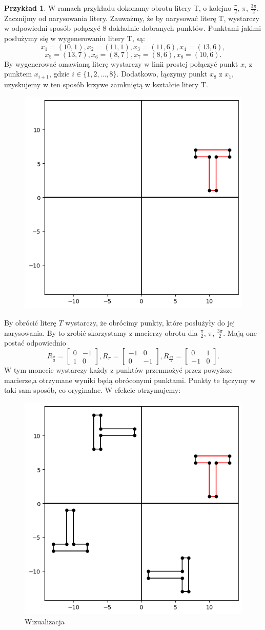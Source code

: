\documentclass[a4paper,twoside,11pt,reqno]{mwrep}
\theoremstyle{plain} \newtheorem{twr}{Twierdzenie}
\theoremstyle{plain} \newtheorem{lem}{Lemat}
\theoremstyle{definition} \newtheorem{defi}{Definicja}
\theoremstyle{remark} \newtheorem*{wni}{Wniosek}
\theoremstyle{definition} \newtheorem{uwaga}{Uwaga}
\theoremstyle{definition}\newtheorem{prz}{Przykład}
\begin{document}
\begin{prz}\label{exT_rotation}
W ramach przykładu dokonamy obrotu litery T, o kolejno $\frac{\pi}{2}$, $\pi$, $\frac{3\pi}{2}$.
Zacznijmy od narysowania litery. Zauważmy, że by narysować literę T, wystarczy w
odpowiedni sposób połączyć $8$ dokładnie dobranych punktów.
Punktami jakimi posłużymy się w wygenerowaniu litery T, są:
$$x_1 = (10,1),x_2 = (11,1),x_3 = (11,6),x_4 = (13,6),$$
$$x_5 = (13,7),x_6 = (8,7),x_7 = (8,6),x_8 = (10,6).$$
By wygenerować omawianą literę wystarczy w linii prostej połączyć punkt
$x_i$ z punktem $x_{i+1}$, gdzie $i\in\{1,2,...,8\}$. Dodatkowo,
łączymy punkt $x_8$ z $x_1$, uzyskujemy w ten sposób krzywe zamkniętą
w kształcie litery T.

\begin{figure}[h]
\begin{center}
\includegraphics[width=5 cm]{T_samo.png}
\caption{}
\end{center}
\end{figure}
\newpage

By obrócić literę $T$ wystarczy, że obrócimy punkty, które posłużyły do jej narysowania.
By to zrobić skorzystamy z macierzy obrotu dla  $\frac{\pi}{2}$, $\pi$, $\frac{3\pi}{2}$.
Mają one postać odpowiednio
$$R_\frac{\pi}{2}=\begin{bmatrix}
0&-1 \\
1&0 
\end{bmatrix},
R_\pi=\begin{bmatrix}
-1&0 \\
0&-1 
\end{bmatrix},
R_\frac{3\pi}{2}=\begin{bmatrix}
0&1 \\
-1&0 
\end{bmatrix}.
$$
W tym monecie wystarczy każdy z punktów przemnożyć przez powyższe macierze,a otrzymane wyniki będą 
obróconymi punktami. Punkty te łączymy w taki sam sposób, co oryginalne. W efekcie otrzymujemy:
\begin{figure}[h]
\begin{center}
\includegraphics[width=5 cm]{T_obroty.png}
\caption{Wizualizacja }
\end{center}
\end{figure}
\end{prz}
\end{document}
